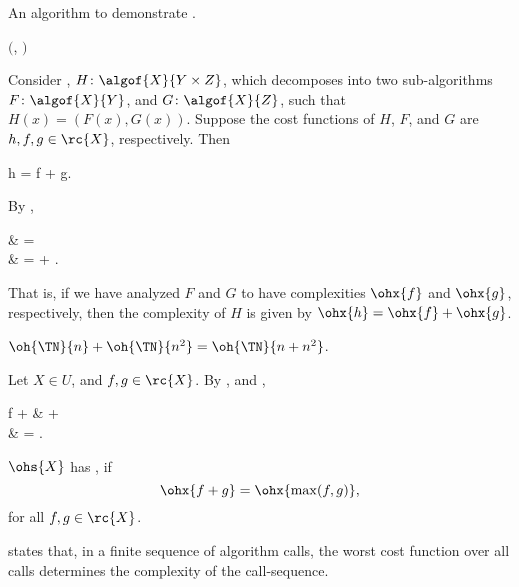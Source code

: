 \documentclass[b5paper, english, oneside]{memoir}
\begin{document}
\begin{algorithm}
\caption{An algorithm to demonstrate .}
\label{alg:sequence}
\begin{algorithmic}[1]
\State \Return $($, $)$
\EndProcedure
\end{algorithmic}
\end{algorithm}

\begin{example}
Consider , $H \colon \algof{X}{Y \times Z}$, which decomposes into two sub-algorithms $F \colon \algof{X}{Y}$, and $G \colon \algof{X}{Z}$, such that $H(x) = (F(x), G(x))$. Suppose the cost functions of $H$, $F$, and $G$ are $h, f, g \in \rc{X}$, respectively. Then 
\begin{eqs}
h = f + g.
\end{eqs}
By ,
\begin{eqs}
 & =  \\
{} & =  + .
\end{eqs}
That is, if we have analyzed $F$ and $G$ to have complexities $\ohx{f}$ and $\ohx{g}$, respectively, then the complexity of $H$ is given by $\ohx{h} = \ohx{f} + \ohx{g}$.
\end{example}

\begin{example}
$\oh{\TN}{n} + \oh{\TN}{n^2} = \oh{\TN}{n + n^2}$.
\end{example}

\begin{example}
Let $X \in U$, and $f, g \in \rc{X}$. By , and , 
\begin{eqs}
f +  & \subset {} +  \\
{} & = .
\end{eqs}
\end{example}

\begin{definition}
$\ohs{X}$ has , if
\begin{equation}
\ohx{f + g} = \ohx{\max(f, g)},
\end{equation}
for all $f, g \in \rc{X}$.
\end{definition}

\begin{note}
 states that, in a finite sequence of algorithm calls, the worst cost function over all calls determines the complexity of the call-sequence.
\end{note}
\end{document}
